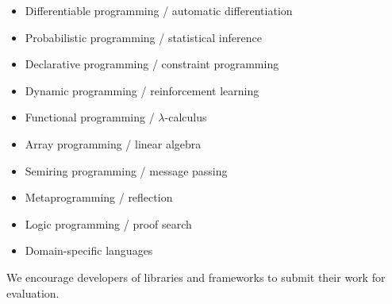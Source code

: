 \documentclass{article}
\begin{document}
    \begin{itemize}
      \item Differentiable programming / automatic differentiation
      \item Probabilistic programming / statistical inference
      \item Declarative programming / constraint programming
      \item Dynamic programming / reinforcement learning
      \item Functional programming / $\lambda$-calculus
      \item Array programming / linear algebra
      \item Semiring programming / message passing
      \item Metaprogramming / reflection
      \item Logic programming / proof search
      \item Domain-specific languages
    \end{itemize}

    We encourage developers of libraries and frameworks to submit their work for evaluation.
\end{document}
